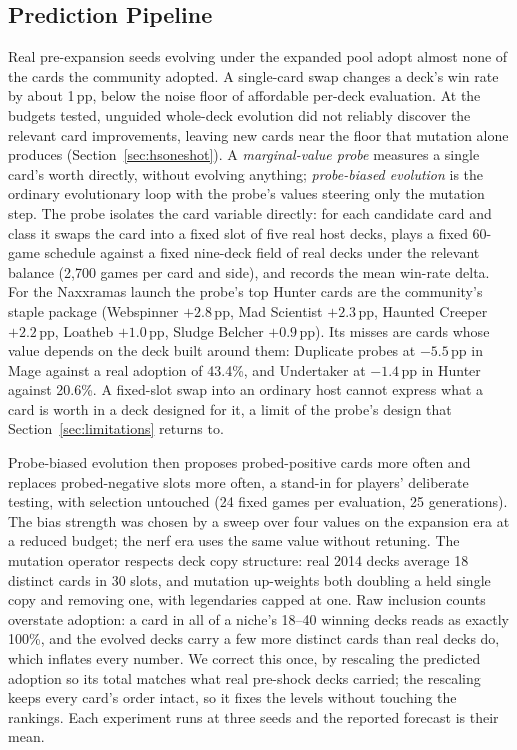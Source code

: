 \documentclass[journal]{IEEEtran}
\newcommand{\pp}{\,\text{pp}}
\begin{document}
\subsection{Prediction Pipeline}

Real pre-expansion seeds evolving under the expanded pool adopt almost
none of the cards the community adopted. A single-card swap changes a
deck's win rate by about 1$\pp$, below the noise floor of affordable
per-deck evaluation. At the budgets tested, unguided whole-deck evolution
did not reliably discover the relevant card improvements, leaving new
cards near the floor that mutation alone produces
(Section~\ref{sec:hsoneshot}). A
\emph{marginal-value probe} measures a single card's worth directly,
without evolving anything; \emph{probe-biased evolution} is the ordinary
evolutionary loop with the probe's values steering only the mutation
step. The probe isolates the card variable directly: for each candidate card and class it swaps the card into a
fixed slot of five real host decks, plays a fixed 60-game schedule
against a fixed nine-deck field of real decks under the relevant
balance (2{,}700 games per card and side), and records the mean win-rate
delta. For the Naxxramas launch the probe's top Hunter cards are the
community's staple package (Webspinner $+2.8\pp$, Mad Scientist
$+2.3\pp$, Haunted Creeper $+2.2\pp$, Loatheb $+1.0\pp$, Sludge Belcher
$+0.9\pp$). Its misses are cards whose value depends on the deck built
around them: Duplicate probes at $-5.5\pp$ in Mage against a real
adoption of 43.4\%, and Undertaker at $-1.4\pp$ in Hunter against
20.6\%. A fixed-slot swap into an ordinary host cannot express what a
card is worth in a deck designed for it, a limit of the probe's design
that Section~\ref{sec:limitations} returns to.

Probe-biased evolution then proposes probed-positive cards more often and
replaces probed-negative slots more often, a stand-in for players'
deliberate testing, with selection untouched (24 fixed games per
evaluation, 25 generations). The bias strength was chosen by a sweep over
four values on the expansion era at a reduced budget; the nerf era uses
the same value without retuning. The mutation operator respects deck copy
structure: real 2014 decks average 18 distinct cards in 30 slots, and
mutation up-weights both doubling a held single copy and removing one,
with legendaries capped at one. Raw inclusion counts overstate adoption: a
card in all of a niche's 18--40 winning decks reads as exactly 100\%, and
the evolved decks carry a few more distinct cards than real decks do,
which inflates every number. We correct this once, by rescaling the
predicted adoption so its total matches what real pre-shock decks
carried; the rescaling keeps every card's order intact, so it fixes the
levels without touching the rankings. Each experiment runs at three seeds
and the reported forecast is their mean.
\end{document}

